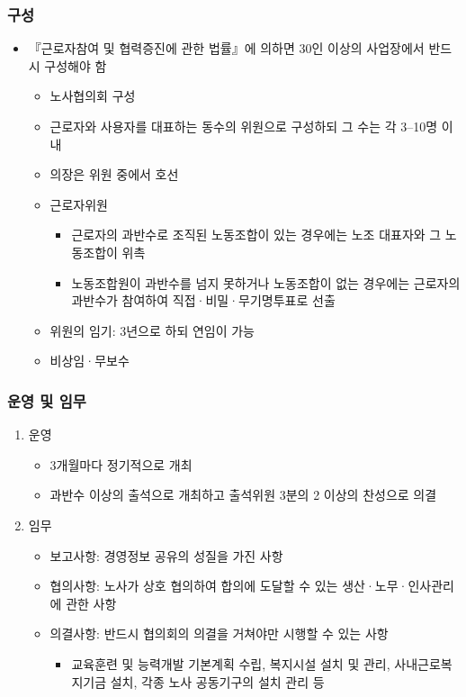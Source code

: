 \documentclass[aspectratio=169,xcolor=dvipsnames,handout]{beamer}
\begin{document}
\begin{frame}
    \frametitle{구성}
    \begin{itemize}[<+->]
        \item 『근로자참여 및 협력증진에 관한 법률』에 의하면 30인 이상의 사업장에서 반드시 구성해야 함
        \begin{itemize}
            \item 노사협의회 구성
            \item 근로자와 사용자를 대표하는 동수의 위원으로 구성하되 그 수는 각 3--10명 이내
            \item 의장은 위원 중에서 호선
            \item 근로자위원
            \begin{itemize}
                \item 근로자의 과반수로 조직된 노동조합이 있는 경우에는 노조 대표자와 그 노동조합이 위촉
                \item 노동조합원이 과반수를 넘지 못하거나 노동조합이 없는 경우에는 근로자의 과반수가 참여하여 직접·비밀·무기명투표로 선출
            \end{itemize}
            \item 위원의 임기: 3년으로 하되 연임이 가능
            \item 비상임·무보수
        \end{itemize}
    \end{itemize}
\end{frame}

\begin{frame}
    \frametitle{운영 및 임무}
    \begin{enumerate}[<+->]
        \item 운영
        \begin{itemize}
            \item 3개월마다 정기적으로 개최
            \item 과반수 이상의 출석으로 개최하고 출석위원 3분의 2 이상의 찬성으로 의결
        \end{itemize}
        \item 임무
        \begin{itemize}
            \item 보고사항: 경영정보 공유의  성질을 가진 사항
            \item 협의사항: 노사가 상호 협의하여 합의에 도달할 수 있는 생산·노무·인사관리에 관한 사항
            \item 의결사항: 반드시 협의회의 의결을 거쳐야만 시행할 수 있는 사항
            \begin{itemize}
                \item 교육훈련 및 능력개발 기본계획 수립, 복지시설 설치 및 관리, 사내근로복지기금 설치, 각종 노사 공동기구의 설치 관리 등
            \end{itemize}
        \end{itemize}
    \end{enumerate}
\end{frame}
\end{document}
